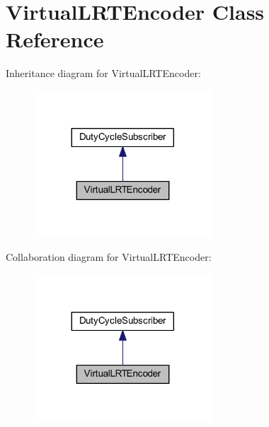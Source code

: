 \hypertarget{class_virtual_l_r_t_encoder}{
\section{\-Virtual\-L\-R\-T\-Encoder \-Class \-Reference}
\label{class_virtual_l_r_t_encoder}
}


\-Inheritance diagram for \-Virtual\-L\-R\-T\-Encoder\-:\nopagebreak
\begin{figure}[H]
\begin{center}
\leavevmode
\includegraphics[width=188pt]{class_virtual_l_r_t_encoder__inherit__graph}
\end{center}
\end{figure}


\-Collaboration diagram for \-Virtual\-L\-R\-T\-Encoder\-:\nopagebreak
\begin{figure}[H]
\begin{center}
\leavevmode
\includegraphics[width=188pt]{class_virtual_l_r_t_encoder__coll__graph}
\end{center}
\end{figure}
